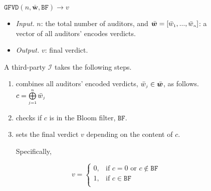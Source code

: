 \begin{figure} [!htb]
\setlength{\fboxsep}{1.9pt}
\begin{center}
    \begin{tcolorbox}[enhanced,width=81mm,height=50.3mm, left=0mm,
    drop fuzzy shadow southwest,
    colframe=black,colback=white]
    \small{
    \vspace{-2.8mm}
\underline{$\mathtt{GFVD}(n,  \bar{\bm w}, \mathtt{BF})\rightarrow  v$}\\
%
    \vspace{-2.8mm}
\begin{itemize}[leftmargin=4.2mm]
\item \noindent\textit{Input.} $n$:  the total number of  auditors,  and  $\bar{\bm w}=[\bar{ w}_{\scriptscriptstyle 1},..., \bar{ w}_{\scriptscriptstyle n}]$:  a vector of all auditors' encodes  verdicts.
%
\item \noindent\textit{Output.} $v$: final verdict.  
%
\end{itemize}
A third-party $\mathcal{I}$ takes the following steps.

\vspace{-1.2mm}
\begin{enumerate}[leftmargin=5.2mm]
%
%
\item combines  all auditors' encoded verdicts, $\bar w_{\scriptscriptstyle j}\in \bar{\bm {w}}$, as follows. 
%
$c= \bigoplus\limits^{\scriptscriptstyle n}_{\scriptscriptstyle j=1} \bar w_{\scriptscriptstyle j}$
%
%
\item checks if $c$ is in the Bloom filter, $\mathtt{BF}$. 
%
\item sets the final verdict $v$ depending on the content of $c$. 

Specifically, 
\vspace{-3.5mm}

\begin{equation*}
   v= 
\begin{cases}
    0,              &\text{if } c= 0 \text{ or } c \notin\mathtt{BF}\\
   1 ,& \text{if } c \in\mathtt{BF}\\


\end{cases}
\end{equation*}
\end{enumerate}}
\end{tcolorbox}
\end{center}
\end{figure}
